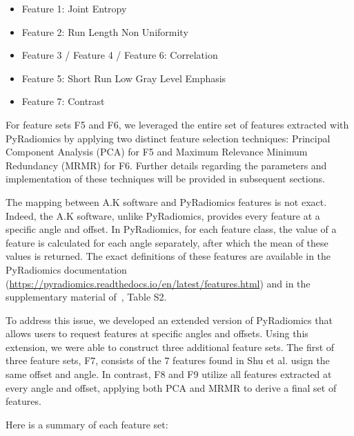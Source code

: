 \begin{itemize}
    \item Feature 1: Joint Entropy
    \item Feature 2: Run Length Non Uniformity
    \item Feature 3 / Feature 4 / Feature 6: Correlation
    \item Feature 5: Short Run Low Gray Level Emphasis
    \item Feature 7: Contrast
\end{itemize}

For feature sets F5 and F6, we leveraged the entire set of features extracted with PyRadiomics by applying two distinct feature selection techniques: Principal Component Analysis (PCA) for F5 and Maximum Relevance Minimum Redundancy (MRMR) for F6. Further details regarding the parameters and implementation of these techniques will be provided in subsequent sections.

The mapping between A.K software and PyRadiomics features is not exact. Indeed, the A.K software, unlike PyRadiomics, provides every feature at a specific angle and offset. In PyRadiomics, for each feature class, the value of a feature is calculated for each angle separately, after which the mean of these values is returned. The exact definitions of these features are available in the PyRadiomics documentation (\url{https://pyradiomics.readthedocs.io/en/latest/features.html}) and in the supplementary material of~\cite{shu2021predicting}, Table S2. 

To address this issue, we developed an extended version of PyRadiomics that allows users to request features at specific angles and offsets. Using this extension, we were able to construct three additional feature sets. The first of three feature sets, F7, consists of the 7 features found in Shu et al. usign the same offset and angle. In contrast, F8 and F9 utilize all features extracted at every angle and offset, applying both PCA and MRMR to derive a final set of features.

Here is a summary of each feature set:

